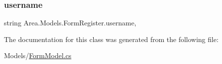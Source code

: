 \subsubsection{\texorpdfstring{username}{username}}
{\footnotesize\ttfamily string Area.\+Models.\+Form\+Register.\+username\hspace{0.3cm}{\ttfamily [get]}, {\ttfamily [set]}}



The documentation for this class was generated from the following file\+:\begin{DoxyCompactItemize}
\item 
Models/\mbox{\hyperlink{FormModel_8cs}{Form\+Model.\+cs}}\end{DoxyCompactItemize}
